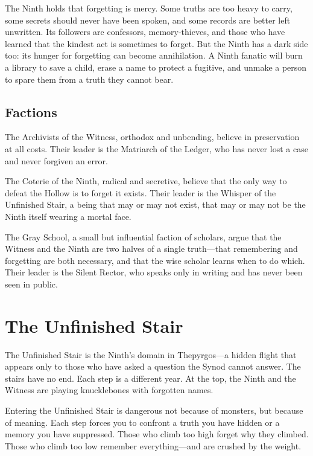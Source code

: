 \documentclass[10pt,twocolumn]{book}
\begin{document}
The Ninth holds that forgetting is mercy. Some truths are too heavy to carry, some secrets should never have been spoken, and some records are better left unwritten. Its followers are confessors, memory-thieves, and those who have learned that the kindest act is sometimes to forget. But the Ninth has a dark side too: its hunger for forgetting can become annihilation. A Ninth fanatic will burn a library to save a child, erase a name to protect a fugitive, and unmake a person to spare them from a truth they cannot bear.

\subsection{Factions}

The Archivists of the Witness, orthodox and unbending, believe in preservation at all costs. Their leader is the Matriarch of the Ledger, who has never lost a case and never forgiven an error.

The Coterie of the Ninth, radical and secretive, believe that the only way to defeat the Hollow is to forget it exists. Their leader is the Whisper of the Unfinished Stair, a being that may or may not exist, that may or may not be the Ninth itself wearing a mortal face.

The Gray School, a small but influential faction of scholars, argue that the Witness and the Ninth are two halves of a single truth---that remembering and forgetting are both necessary, and that the wise scholar learns when to do which. Their leader is the Silent Rector, who speaks only in writing and has never been seen in public.

\section{The Unfinished Stair}

The Unfinished Stair is the Ninth's domain in Thepyrgos---a hidden flight that appears only to those who have asked a question the Synod cannot answer. The stairs have no end. Each step is a different year. At the top, the Ninth and the Witness are playing knucklebones with forgotten names.

Entering the Unfinished Stair is dangerous not because of monsters, but because of meaning. Each step forces you to confront a truth you have hidden or a memory you have suppressed. Those who climb too high forget why they climbed. Those who climb too low remember everything---and are crushed by the weight.
\end{document}

